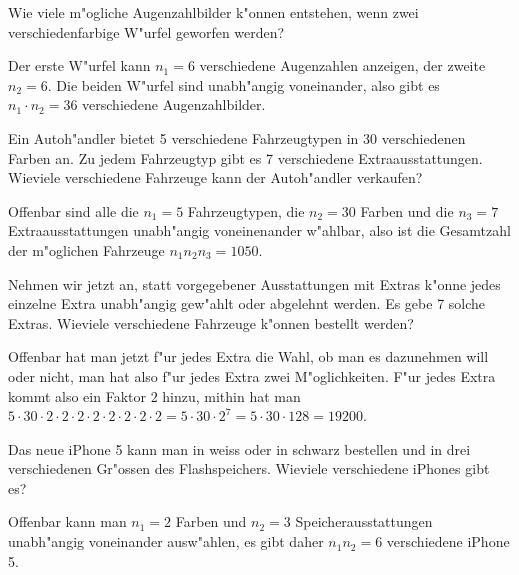 \begin{beispiele}
\item Wie viele m"ogliche Augenzahlbilder k"onnen entstehen, wenn zwei
verschiedenfarbige W"urfel geworfen werden?

\begin{loesung}
Der erste W"urfel kann $n_1=6$ verschiedene Augenzahlen anzeigen,
der zweite $n_2=6$. Die beiden W"urfel sind unabh"angig voneinander,
also gibt es $n_1\cdot n_2=36$ verschiedene Augenzahlbilder.
\end{loesung}


\item Ein Autoh"andler bietet 5 verschiedene Fahrzeugtypen in 30
verschiedenen Farben an. Zu jedem Fahrzeugtyp gibt es 7 verschiedene
Extraausstattungen. Wieviele
verschiedene Fahrzeuge kann der Autoh"andler verkaufen?

\begin{loesung}
Offenbar sind alle die $n_1=5$ Fahrzeugtypen, die $n_2=30$ Farben
und die $n_3=7$ Extraausstattungen unabh"angig voneinenander w"ahlbar, also ist
die Gesamtzahl der m"oglichen Fahrzeuge $n_1n_2n_3=1050$.
\end{loesung}

\item Nehmen wir jetzt an, statt vorgegebener Ausstattungen mit
Extras k"onne jedes einzelne Extra unabh"angig gew"ahlt oder
abgelehnt werden. Es gebe 7 solche Extras. Wieviele verschiedene
Fahrzeuge k"onnen bestellt werden?

\begin{loesung}
Offenbar hat man jetzt f"ur jedes Extra die Wahl, ob man es dazunehmen
will oder nicht, man hat also f"ur jedes Extra zwei M"oglichkeiten.
F"ur jedes Extra kommt also ein Faktor $2$ hinzu, mithin hat man
$5\cdot 30
\cdot 2
\cdot 2
\cdot 2
\cdot 2
\cdot 2
\cdot 2
\cdot 2
\cdot 2=5\cdot 30\cdot 2^7=5\cdot 30 \cdot 128=19200$.
\end{loesung}

\item Das neue iPhone 5 kann man in weiss oder in schwarz
bestellen und in drei verschiedenen
Gr"ossen des Flashspeichers. Wieviele verschiedene iPhones gibt es?

\begin{loesung}
Offenbar kann man $n_1=2$ Farben und $n_2=3$ Speicherausstattungen
unabh"angig voneinander ausw"ah\-len, es gibt
daher $n_1n_2=6$ verschiedene iPhone 5.
\end{loesung}

\end{beispiele}

